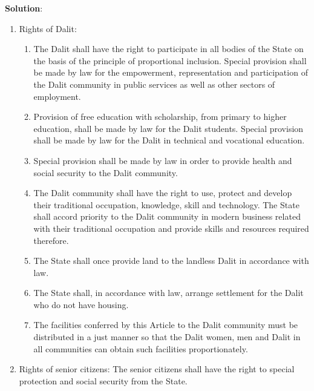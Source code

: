 \documentclass[
  openany]{book}
\newenvironment{solution}{ {\bfseries Solution}:}{}
\begin{document}
\begin{questions}
\begin{solution}
\begin{enumerate}
\item Rights of Dalit:
\begin{enumerate}
\item The Dalit shall have the right to participate in all bodies of the State on the basis of the principle of proportional inclusion. Special provision shall be made by law for the empowerment, representation and participation of the Dalit community in public services as well as other sectors of employment.
\item Provision of free education with scholarship, from primary to higher education, shall be made by law for the Dalit students. Special provision shall be made by law for the Dalit in technical and vocational education.
\item Special provision shall be made by law in order to provide health and social security to the Dalit community.
\item The Dalit community shall have the right to use, protect and develop their traditional occupation, knowledge, skill and technology. The State shall accord priority to the Dalit community in modern business related with their traditional occupation and provide skills and resources required therefore.
\item The State shall once provide land to the landless Dalit in accordance with law.
\item The State shall, in accordance with law, arrange settlement for the Dalit who do not have housing.
\item The facilities conferred by this Article to the Dalit community must be distributed in a just manner so that the Dalit women, men and Dalit in all communities can obtain such facilities proportionately.
\end{enumerate}

\item Rights of senior citizens: The senior citizens shall have the right to special protection and social security from the State.


\end{enumerate}
\end{solution}
\end{questions}
\end{document}
